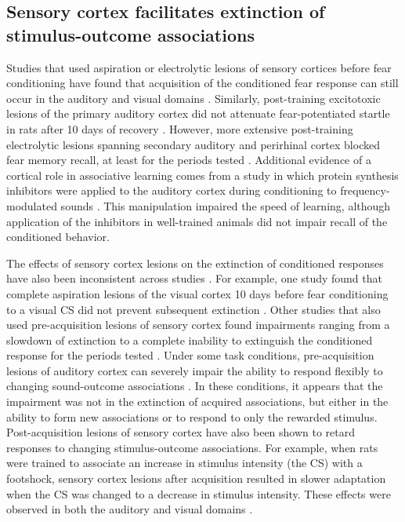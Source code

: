 \subsection{Sensory cortex facilitates extinction of stimulus-outcome associations} 


Studies that used aspiration or electrolytic lesions of sensory cortices before fear conditioning have found that acquisition of the conditioned fear response can still occur in the auditory \citep{Teich1989, Campeau1995, Song2010} and visual domains \citep{LeDoux1989, Falls1993}. 
%
Similarly, post-training excitotoxic lesions of the primary auditory cortex did not attenuate fear-potentiated startle in rats after 10 days of recovery \citep{Campeau1995}. 
%
However, more extensive post-training electrolytic lesions spanning secondary auditory and perirhinal cortex blocked fear memory recall, at least for the periods tested \citep{Campeau1995, Boatman2006}. Additional evidence of a cortical role in associative learning comes from a study in which protein synthesis inhibitors were applied to the auditory cortex during conditioning to frequency-modulated sounds \citep{Kraus2002}. 
%
This manipulation impaired the speed of learning, although application of the inhibitors in well-trained animals did not impair recall of the conditioned behavior. 

The effects of sensory cortex lesions on the extinction of conditioned responses have also been inconsistent across studies \citep[reviewed in][]{Myers2002}. 
%
For example, one study found that complete aspiration lesions of the visual cortex 10 days before fear conditioning to a visual CS did not prevent subsequent extinction \citep{Falls1993}. Other studies that also used pre-acquisition lesions of sensory cortex found impairments ranging from a slowdown of extinction \citep{Song2010} to a complete inability to extinguish the conditioned response for the periods tested \citep{LeDoux1989, Teich1989}.
%
Under some task conditions, pre-acquisition lesions of auditory cortex can severely impair the ability to respond flexibly to changing sound-outcome associations \citep{Ono2006}.
%
In these conditions, it appears that the impairment was not in the extinction of acquired associations, but either in the ability to form new associations or to respond to only the rewarded stimulus.
%
Post-acquisition lesions of sensory cortex have also been shown to retard responses to changing stimulus-outcome associations. For example, when rats were trained to associate an increase in stimulus intensity (the CS) with a footshock, sensory cortex lesions after acquisition resulted in slower adaptation when the CS was changed to a decrease in stimulus intensity. These effects were observed in both the auditory and visual domains \citep{Delay1994}. 



